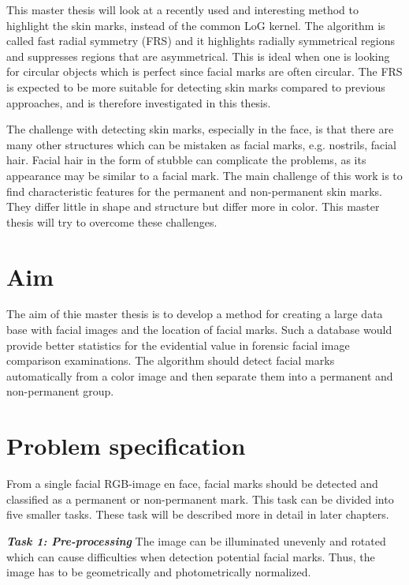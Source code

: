 This master thesis will look at a recently used and interesting method to highlight the skin marks, instead of the common LoG kernel. The algorithm is called fast radial symmetry (FRS) \cite{twins,automatic_detector_2015} and it highlights radially symmetrical regions and suppresses regions that are asymmetrical. This is ideal when one is looking for circular objects which is perfect since facial marks are often circular. The FRS is expected to be more suitable for detecting skin marks compared to previous approaches, and is therefore investigated in this thesis.

The challenge with detecting skin marks, especially in the face, is that there are many other structures which can be mistaken as facial marks, e.g. nostrils, facial hair. Facial hair in the form of stubble can complicate the problems, as its appearance may be similar to a facial mark. The main challenge of this work is to find characteristic features for the permanent and non-permanent skin marks. They differ little in shape and structure but differ more in color. This master thesis will try to overcome these challenges. 


\section{Aim}

The aim of thie master thesis is to develop a method for creating a large data base with facial images and the location of facial marks. Such a database would provide better statistics for the evidential value in forensic facial image comparison examinations. The algorithm should detect facial marks automatically from a color image and then separate them into a permanent and non-permanent group.

\section{Problem specification}

From a single facial RGB-image en face, facial marks should be detected and classified as a permanent or non-permanent mark. This task can be divided into five smaller tasks. These task will be described more in detail in later chapters.

\textbf{\textit{Task 1: Pre-processing}}
The image can be illuminated unevenly and rotated which can cause difficulties when detection potential facial marks. Thus, the image has to be geometrically and photometrically normalized. 

